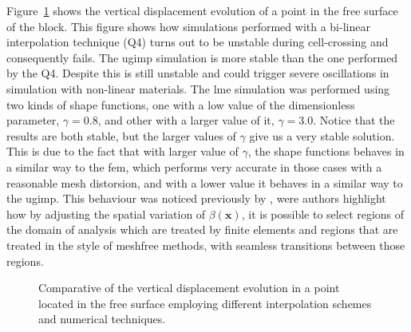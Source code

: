 \documentclass[preprint,12pt,a4paper]{elsarticle}
\newcommand{\vect}[1]{
  \ensuremath{\mathbf{{#1}}}
}
\begin{document}
Figure~\ref{fig:vertical-displacement-block} shows the vertical
displacement evolution of a point in the free surface of the
block. This figure shows how simulations performed with a bi-linear
interpolation technique (Q4) turns out to be unstable during
cell-crossing and consequently fails. The \acrshort{ugimp} simulation
is more stable than the one performed by the Q4. Despite this is still
unstable and could trigger severe oscillations in simulation with
non-linear  materials. The \acrshort{lme} simulation was performed
using two kinds of shape functions, one with a low value of the
dimensionless parameter, $\gamma = 0.8$, and other with a larger value
of it, $\gamma = 3.0$. Notice that the results are both stable, but
the larger values of $\gamma$ give us a very stable solution. This is
due to the fact that with larger value of $\gamma$, the shape
functions behaves in a similar way to the \acrshort{fem}, which performs very
accurate in those cases with a reasonable mesh distorsion, and with a
lower value it behaves in a similar way to the \acrshort{ugimp}. This behaviour
was noticed previously by \cite{Arroyo2006}, were authors highlight
how by adjusting the spatial variation of $\beta(\vect{x})$, it is
possible to select regions of the domain of analysis which are treated
by finite elements and regions that are treated in the style of
meshfree methods, with seamless transitions between those regions. 
\begin{figure}\sidecaption
  \centering
  \caption{Comparative of the vertical displacement evolution in a
    point located in the free surface employing different
    interpolation schemes and numerical techniques.} 
  \label{fig:vertical-displacement-block}
\end{figure}
\end{document}
